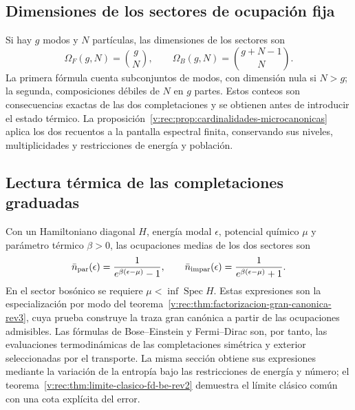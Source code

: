 \subsection{Dimensiones de los sectores de ocupación fija}
\label{v:rec:completaciones:section:07}

Si hay \(g\) modos y \(N\) partículas, las dimensiones de los sectores son
\begin{equation}
 \Omega_F(g,N)=\binom gN,
 \qquad
 \Omega_B(g,N)=\binom{g+N-1}{N}.
 \label{v:ocupacion:eq:dimensiones-sectores}
\end{equation}
La primera fórmula cuenta subconjuntos de modos, con dimensión nula si
\(N>g\); la segunda, composiciones débiles de \(N\) en \(g\) partes.
Estos conteos son consecuencias exactas de las dos completaciones y se
obtienen antes de introducir el estado térmico. La
proposición~\ref{v:rec:prop:cardinalidades-microcanonicas} aplica los dos
recuentos a la pantalla espectral finita, conservando sus niveles,
multiplicidades y restricciones de energía y población.

\subsection{Lectura térmica de las completaciones graduadas}
\label{v:ocupacion:lectura-termica}

Con un Hamiltoniano diagonal \(H\), energía modal \(\epsilon\), potencial
químico \(\mu\) y parámetro térmico \(\beta>0\), las ocupaciones medias
de los dos sectores son
\begin{equation}
 \bar n_{\rm par}(\epsilon)
 =\frac{1}{e^{\beta(\epsilon-\mu)}-1},
 \qquad
 \bar n_{\rm impar}(\epsilon)
 =\frac{1}{e^{\beta(\epsilon-\mu)}+1}.
 \label{v:ocupacion:eq:leyes-por-modo}
\end{equation}
En el sector bosónico se requiere \(\mu<\inf\operatorname{Spec}H\).
Estas expresiones son la especialización por modo del
teorema~\ref{v:rec:thm:factorizacion-gran-canonica-rev3}, cuya prueba
construye la traza gran canónica a partir de las ocupaciones admisibles.
Las fórmulas de Bose--Einstein y Fermi--Dirac son, por tanto, las
evaluaciones termodinámicas de las completaciones simétrica y exterior
seleccionadas por el transporte. La misma sección obtiene sus expresiones
mediante la variación de la entropía bajo las restricciones de energía y
número; el teorema~\ref{v:rec:thm:limite-clasico-fd-be-rev2} demuestra el
límite clásico común con una cota explícita del error.

